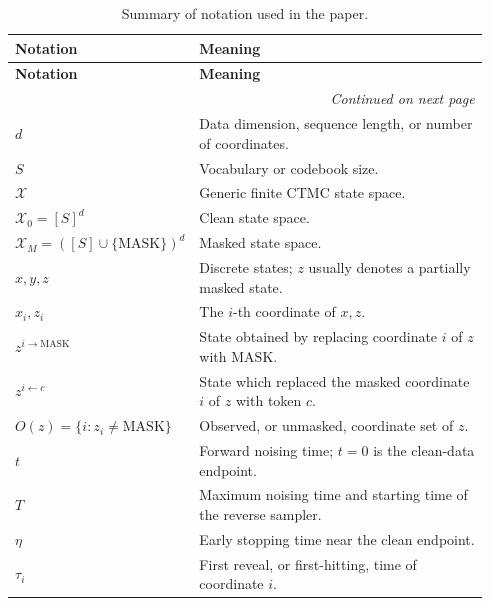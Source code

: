 \documentclass{article}
\begin{document}
\begin{longtable}{p{0.28\linewidth}p{0.66\linewidth}}
\caption{Summary of notation used in the paper.}
\label{tab:notation}\\
\toprule
\textbf{Notation} & \textbf{Meaning} \\
\midrule
\endfirsthead

\toprule
\textbf{Notation} & \textbf{Meaning} \\
\midrule
\endhead

\midrule
\multicolumn{2}{r}{\emph{Continued on next page}}\\
\midrule
\endfoot

\bottomrule
\endlastfoot

\(d\) & Data dimension, sequence length, or number of coordinates. \\
\(S\) & Vocabulary or codebook size. \\
\(\mathcal X\)  & Generic finite CTMC state space. \\
\(\mathcal X_0=[S]^d\) & Clean state space. \\
\(\mathcal X_M=([S]\cup\{\mathrm{MASK}\})^d\) & Masked state space. \\
\(x,y,z\) & Discrete states; \(z\) usually denotes a partially masked state. \\
\(x_i,z_i\) & The \(i\)-th coordinate of \(x,z\). \\
\(z^{i\to\mathrm{MASK}}\) & State obtained by replacing coordinate \(i\) of \(z\) with \(\mathrm{MASK}\). \\
\(z^{i\leftarrow c}\) & State which replaced the masked coordinate \(i\) of \(z\) with token \(c\). \\
\(O(z)=\{i:z_i\neq\mathrm{MASK}\}\) & Observed, or unmasked, coordinate set of \(z\). \\
\(t\) & Forward noising time; \(t=0\) is the clean-data endpoint. \\
\(T\) & Maximum noising time and starting time of the reverse sampler. \\
\(\eta\) & Early stopping time near the clean endpoint. \\
\(\tau_i\) & First reveal, or first-hitting, time of coordinate \(i\). \\



\end{longtable}
\end{document}
